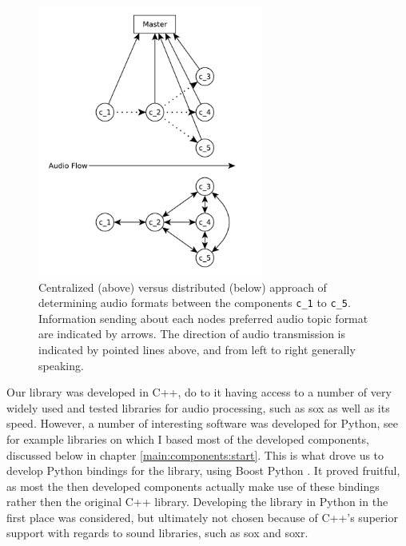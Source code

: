 \begin{figure}[]
	\centering
	\includegraphics[width=0.66\textwidth]{diagrams/lib_central_vs_dist.pdf}
	\caption{Centralized (above) versus distributed (below) approach of determining audio formats between the components \texttt{c\_1} to \texttt{c\_5}.
		Information sending about each nodes preferred audio topic format are indicated by arrows.
		The direction of audio transmission is indicated by pointed lines above, and from left to right generally speaking.}
	\label{pic:main:lib:central_vs_dist}
\end{figure}

Our library was developed in C++, do to it having access to a number of very widely used and tested libraries for audio processing, such as \gls{sox} as well as its speed.
However, a number of interesting software was developed for Python, see for example libraries on which I based most of the developed components, discussed below in chapter \ref{main:components:start}.
This is what drove us to develop Python bindings for the library, using Boost Python \cite{Abrahams2003BuildingHS}.
It proved fruitful, as most the then developed components actually make use of these bindings rather then the original C++ library.
Developing the library in Python in the first place was considered, but ultimately not chosen because of C++'s superior support with regards to sound libraries, such as \gls{sox} and \gls{soxr}.

